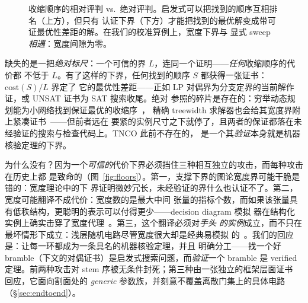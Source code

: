 \documentclass[11pt]{ctexart}
\begin{document}
\begin{figure}[t]
\centering
{}
\caption{收缩顺序的相对评判 vs.\ 绝对评判。启发式可以把找到的顺序互相排名（上方），但只有
认证下界（下方）才能把找到的最优解变成带可证最优性差距的解。在我们的校准算例上，宽度下界与
显式 sweep \emph{相遇}：宽度间隙为零。}
\label{fig:yardstick}
\end{figure}

缺失的是一把\emph{绝对标尺}：一个可信的界 $L$，连同一个证明——\emph{任何}收缩顺序的代价都
不低于 $L$。有了这样的下界，任何找到的顺序 $S$ 都获得一张证书：$\mathrm{cost}(S)/L$ 界定了
它的最优性差距——正如 LP 对偶界为分支定界的当前解作证，或 UNSAT 证书为 SAT 搜索收尾。绝对
参照的碎片是存在的：穷举动态规划能为小网络找到保证最优的收缩序~\cite{pfeifer2014faster}，
精确 treewidth 求解器也会给其宽度界附上紧凑证书~\cite{tamaki2022heuristic}——但前者远在
要紧的实例尺寸之下就停了，且两者的保证都落在未经验证的搜索与检查代码上。TNCO 此前不存在的，
是一个其\emph{验证}本身就是机器核验定理的下界。

为什么没有？因为一个\emph{可信的}代价下界必须挡住三种相互独立的攻击，而每种攻击在历史上都
是致命的（图~\ref{fig:floors}）。第一，支撑下界的图论宽度界可能干脆是错的：宽度理论中的下
界证明微妙冗长，未经验证的界什么也认证不了。第二，宽度可能翻译不成代价：宽度数的是最大中间
张量的指标个数，而如果该张量具有低秩结构，更聪明的表示可以付得更少——decision diagram 模拟
器在结构化实例上确实击穿了宽度代理~\cite{dd2025treewidth}。第三，这个翻译必须对\emph{手头
的实例}成立，而不只在最坏情形下成立：浅层随机电路尽管宽度很大却是经典易模拟
的~\cite{napp2022efficient}。我们的回应是：让每一环都成为一条具名的机器核验定理，并且
明确分工——找一个好 bramble（下文的对偶证书）是启发式搜索问题，而\emph{验证}一个
bramble 是 verified 定理。前两种攻击对 stem 序被无条件封死；第三种由一张独立的框架层面证书
回应，它面向割面处的 \emph{generic} 参数族，并刻意不覆盖离散门集上的具体电路
（\S\ref{sec:endtoend}）。
\end{document}
